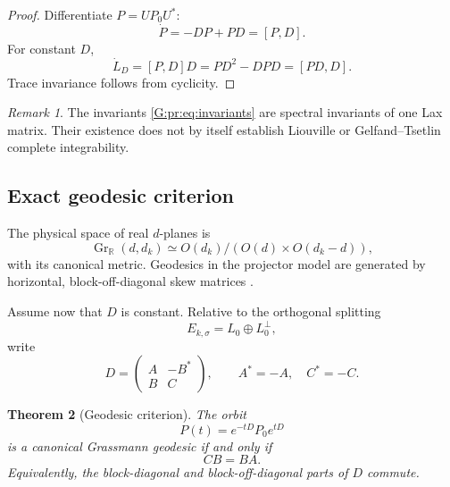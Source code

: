 \documentclass[
 aps,
 prd,
 reprint,
 amsmath,
 amssymb,
 nofootinbib,
 superscriptaddress
]{revtex4-2}
\newtheorem{theorem}{Theorem}[section]
\theoremstyle{definition}
\theoremstyle{remark}
\newtheorem{remark}[theorem]{Remark}
\newcommand{\Gr}{\operatorname{Gr}}
\begin{document}
\begin{proof}
Differentiate \(P=UP_0U^*\):
\[
 \dot P=-DP+PD=[P,D].
\]
For constant \(D\),
\[
 \dot L_D=[P,D]D=PD^2-DPD=[PD,D].
\]
Trace invariance follows from cyclicity.
\end{proof}

\begin{remark}
The invariants \eqref{G:pr:eq:invariants} are spectral invariants of one Lax
matrix.  Their existence does not by itself establish Liouville or
Gelfand--Tsetlin complete integrability.
\end{remark}

\subsection{Exact geodesic criterion}

The physical space of real \(d\)-planes is
\[
 \Gr_{\mathbb R}(d,d_k)
 \simeq
 O(d_k)/(O(d)\times O(d_k-d)),
\]
with its canonical metric.  Geodesics in the projector model are generated
by horizontal, block-off-diagonal skew matrices
\cite{Edelman1998,Bendokat2024}.

Assume now that \(D\) is constant.  Relative to the orthogonal splitting
\[
 E_{k,\sigma}=L_0\oplus L_0^\perp,
\]
write
\begin{equation}
 D=
 \begin{pmatrix}
 A&-B^*\\
 B&C
 \end{pmatrix},
 \qquad
 A^*=-A,\quad C^*=-C.
 \label{G:pr:eq:blockD}
\end{equation}

\begin{theorem}[Geodesic criterion]
\label{G:pr:thm:geodesic}
The orbit
\[
 P(t)=e^{-tD}P_0e^{tD}
\]
is a canonical Grassmann geodesic if and only if
\begin{equation}
 \boxed{CB=BA.}
 \label{G:pr:eq:geodesiccriterion}
\end{equation}
Equivalently, the block-diagonal and block-off-diagonal parts of \(D\)
commute.
\end{theorem}
\end{document}
